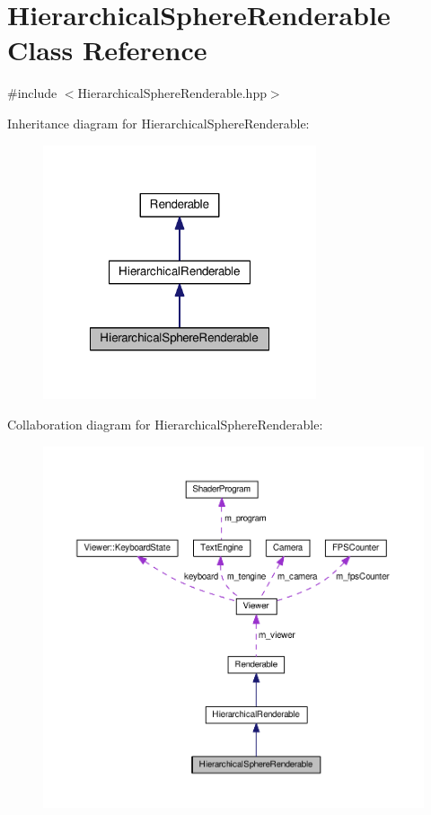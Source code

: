 \hypertarget{classHierarchicalSphereRenderable}{\section{Hierarchical\+Sphere\+Renderable Class Reference}
\label{classHierarchicalSphereRenderable}
}


{\ttfamily \#include $<$Hierarchical\+Sphere\+Renderable.\+hpp$>$}



Inheritance diagram for Hierarchical\+Sphere\+Renderable\+:\nopagebreak
\begin{figure}[H]
\begin{center}
\leavevmode
\includegraphics[width=228pt]{classHierarchicalSphereRenderable__inherit__graph}
\end{center}
\end{figure}


Collaboration diagram for Hierarchical\+Sphere\+Renderable\+:\nopagebreak
\begin{figure}[H]
\begin{center}
\leavevmode
\includegraphics[width=350pt]{classHierarchicalSphereRenderable__coll__graph}
\end{center}
\end{figure}
